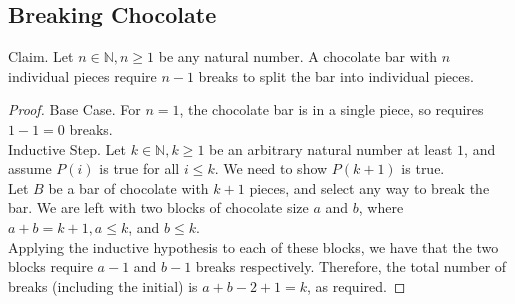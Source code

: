 \documentclass{article}
\begin{document}
\subsection{Breaking Chocolate}
Claim. Let $n \in \mathbb{N}, n \geq 1$ be any natural number. A chocolate bar with $n$ individual pieces require $n - 1$ breaks to split the bar into individual pieces.
\begin{proof}
Base Case. For $n = 1$, the chocolate bar is in a single piece, so requires $1 - 1 = 0$ breaks.\\
Inductive Step. Let $k \in \mathbb{N}, k \geq 1$ be an arbitrary natural number at least $1$, and assume $P(i)$ is true for all $i \leq k$. We need to show $P(k + 1)$ is true.\\
Let $B$ be a bar of chocolate with $k + 1$ pieces, and select any way to break the bar. We are left with two blocks of chocolate size $a$ and $b$, where $a+b = k + 1, a \leq k$, and $b \leq k$.\\
Applying the inductive hypothesis to each of these blocks, we have that the two blocks require $a - 1$ and $b - 1$ breaks respectively. Therefore, the total number of breaks (including the initial) is $a + b - 2 + 1 = k$, as required.
\end{proof}
\end{document}
